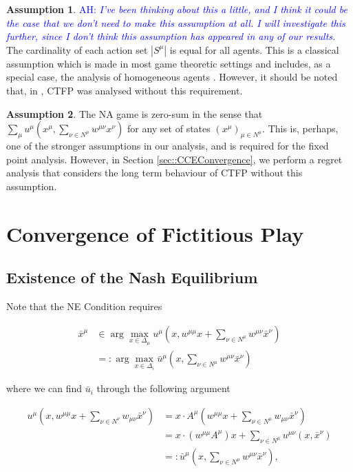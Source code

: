 \documentclass{article}
\theoremstyle{definition}
\newtheorem{assumption}{Assumption}
\newcommand{\ah}[1]{\textcolor{blue}{AH: \textit{#1}}}
\newcommand{\actionset}[1]{S^{#1}}
\newcommand{\wmunu}{w^{\mu \nu}}
\newcommand{\xmu}{x^{\mu}}
\newcommand{\xnu}{x^{\nu}}
\newcommand{\NE}[1]{\bar{x}^{#1}}
\newcommand{\weightedsum}{ \sum_{\nu \in N^\mu} \wmunu \xnu}
\begin{document}
	\begin{assumption}
		\ah{I've been thinking about this a little, and I think it could be the case that
		we don't need to make this assumption at all. I will investigate this further, since I don't
		think this assumption has appeared in any of our results.} The cardinality of each action set $|\actionset{\mu}|$ is equal for all agents. This is
		a classical assumption which is made in most game theoretic settings and includes, as a
		special case, the analysis of homogeneous agents \cite{}. However, it should be noted that,
		in \cite{Ewerhart}, CTFP was analysed without this requirement.  
	\end{assumption}

	\begin{assumption}
		The NA game is zero-sum in the sense that $\sum_{\mu} u^\mu(\xmu, \weightedsum)$ for any set
		of states $(x^\mu)_{\mu \in N^\mu}$. This is, perhaps, one of the stronger assumptions in
		our analysis, and is required for the fixed point analysis. However, in Section
		\ref{sec::CCEConvergence}, we perform a regret analysis that considers the long term
		behaviour of CTFP without this assumption.
	\end{assumption}
        

	\section{Convergence of Fictitious Play}

	\subsection{Existence of the Nash Equilibrium}
	\label{sec::ExistenceofNE}
	
	Note that the NE Condition requires

	\begin{align}
		\NE{\mu} &\in \arg\max_{x \in \Delta_\mu} u^\mu(x, w^{\mu \mu}x + \sum_{\nu \in N^\mu} w^{\mu \nu} \NE{\nu}) \nonumber \\
		& =: \arg\max_{x \in \Delta_i} \bar{u}^\mu(x, \sum_{\nu \in N^\mu} w^{\mu \nu} \NE{\nu})
	\end{align}

	where we can find $\bar{u}_i$ through the following argument
	
	\begin{align}
		u^\mu(x, w^{\mu \mu} x + \sum_{\nu \in N^\nu} w_{\mu \nu} \NE{\nu}) & = x \cdot A^\mu (w^{\mu \mu} x + \sum_{\nu \in N^\mu} w_{\mu \nu} \NE{\nu}) \\
		 & = x \cdot (w^{\mu \mu} A^\mu)  x + \sum_{\nu \in N^\mu} u^{\mu \nu}(x, \NE{\nu}) \\
		 & =: \bar{u}^\mu(x, \sum_{\nu \in N^\mu} w^{\mu \nu} \NE{\nu}), \nonumber
	\end{align}
	
\end{document}
